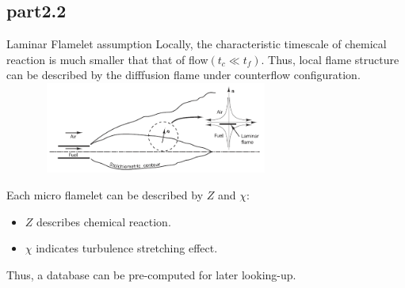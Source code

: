 	\subsection{part2.2}
		\begin{xframe}{Laminar Flamelet assumption}
			Locally, the characteristic timescale of chemical reaction is much smaller that that of flow$(t_c \ll t_f)$.\newline
			Thus, local flame structure can be described by the difffusion flame under counterflow configuration.
			\includegraphics[width=10cm, height=3cm]{../pic/flamelet.png}
			
			Each micro flamelet can be described by $Z$ and $\chi$:
			\begin{itemize}
				\item $Z$ describes chemical reaction.
				\item $\chi$ indicates turbulence stretching effect.
			\end{itemize}
			Thus, a database can be pre-computed for later looking-up. 
		\end{xframe}
